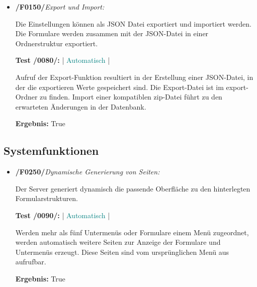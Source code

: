 \begin{itemize}
        \item \textbf{/F0150/}\textit{Export und Import:} \par
        Die Einstellungen können als JSON Datei exportiert und importiert werden. Die Formulare werden zusammen mit der JSON-Datei in einer Ordnerstruktur exportiert.\par
        \noindent \textbf{Test /0080/:} | \textcolor{teal}{Automatisch} |\par
        Aufruf der Export-Funktion resultiert in der Erstellung einer JSON-Datei, in der die exportieren Werte gespeichert sind. Die Export-Datei ist im export-Ordner zu finden. Import einer kompatiblen zip-Datei führt zu den erwarteten Änderungen in der Datenbank.\par
        \noindent \textbf{Ergebnis:} True
    \end{itemize}{}
  
  \vspace{1cm}  
  \subsection{Systemfunktionen}
  
    \begin{itemize}
        \item \textbf{/F0250/}\textit{Dynamische Generierung von Seiten:} \par
        Der Server generiert dynamisch die passende Oberfläche zu den hinterlegten Formularstrukturen.\par
        \noindent \textbf{Test /0090/:} | \textcolor{teal}{Automatisch} |  \par
        Werden mehr als fünf Untermenüs oder Formulare einem Menü zugeordnet, werden automatisch weitere Seiten zur Anzeige der Formulare und Untermenüs erzeugt. Diese Seiten sind vom ursprünglichen Menü aus aufrufbar.\par
        \noindent \textbf{Ergebnis:} True
    \end{itemize}